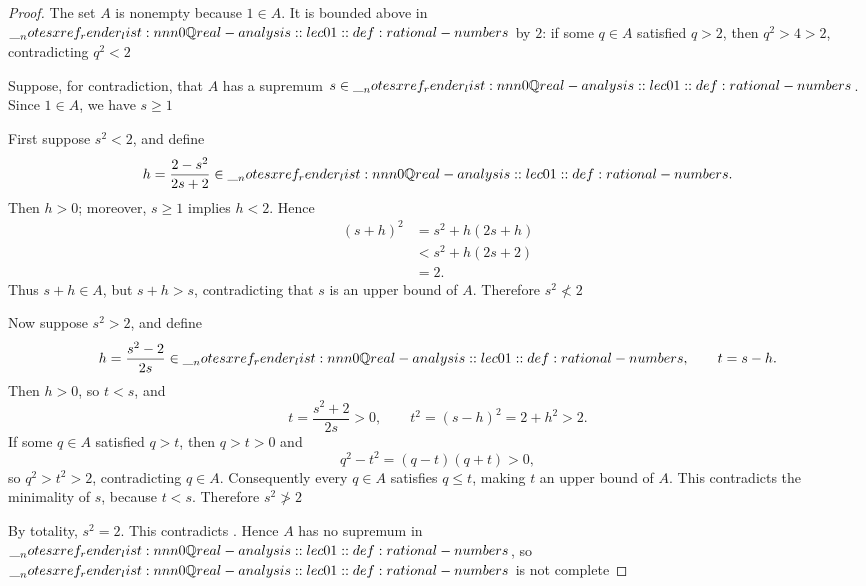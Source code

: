 \documentclass[12pt]{article}
\begin{document}
\begin{proof}
  The set \(A\) is nonempty because \(1\in A\). It is bounded above in
  \(\QQ\) by \(2\): if some \(q\in A\) satisfied \(q>2\), then
  \(q^2>4>2\), contradicting \(q^2<2\)

  Suppose, for contradiction, that \(A\) has a supremum \(s\in\QQ\).
  Since \(1\in A\), we have \(s\geq1\)

  First suppose \(s^2<2\), and define
  \[
    h=\frac{2-s^2}{2s+2}\in\QQ.
  \]
  Then \(h>0\); moreover, \(s\geq1\) implies \(h<2\). Hence
  \begin{align*}
    (s+h)^2
      &=s^2+h(2s+h)\\
      &<s^2+h(2s+2)\\
      &=2.
  \end{align*}
  Thus \(s+h\in A\), but \(s+h>s\), contradicting that \(s\) is an
  upper bound of \(A\). Therefore \(s^2\not<2\)

  Now suppose \(s^2>2\), and define
  \[
    h=\frac{s^2-2}{2s}\in\QQ,
    \qquad
    t=s-h.
  \]
  Then \(h>0\), so \(t<s\), and
  \[
    t=\frac{s^2+2}{2s}>0,
    \qquad
    t^2=(s-h)^2=2+h^2>2.
  \]
  If some \(q\in A\) satisfied \(q>t\), then \(q>t>0\) and
  \[
    q^2-t^2=(q-t)(q+t)>0,
  \]
  so \(q^2>t^2>2\), contradicting \(q\in A\). Consequently every
  \(q\in A\) satisfies \(q\leq t\), making \(t\) an upper bound of
  \(A\). This contradicts the minimality of \(s\), because \(t<s\).
  Therefore \(s^2\not>2\)

  By totality, \(s^2=2\). This contradicts
  . Hence \(A\) has no supremum in
  \(\QQ\), so \(\QQ\) is not complete
\end{proof} 
\end{document}
